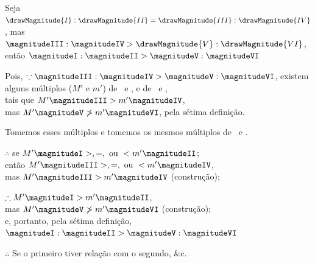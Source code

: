 \documentclass[booklanguage=brazilian]{byrnebook}
\begin{document}
\begin{center}
Seja $\drawMagnitude{I} : \drawMagnitude{II} = \drawMagnitude{III} : \drawMagnitude{IV}$, mas $\magnitudeIII : \magnitudeIV > \drawMagnitude{V} : \drawMagnitude{VI}$,\\
então $\magnitudeI : \magnitudeII > \magnitudeV : \magnitudeVI$

Pois, $\because \magnitudeIII : \magnitudeIV > \magnitudeV : \magnitudeVI$, existem alguns múltiplos ($M'$ e $m'$) de \magnitudeIII\ e \magnitudeV, e de \magnitudeIV\ e \magnitudeVI,\\ %
tais que $M' \magnitudeIII > m' \magnitudeIV$,\\
mas $M' \magnitudeV \ngtr m' \magnitudeVI$, pela sétima definição. %

Tomemos esses múltiplos e tomemos os mesmos múltiplos de \magnitudeI\ e \magnitudeII.

$\therefore$  se $M' \magnitudeI >, =, \mbox{ ou } < m' \magnitudeII$;\\
então $M' \magnitudeIII >, =, \mbox{ ou } < m' \magnitudeIV$,\\
mas $M' \magnitudeIII > m' \magnitudeIV$ (construção);

$\therefore M' \magnitudeI > m' \magnitudeII$,\\
mas $M' \magnitudeV \ngtr m' \magnitudeVI$ (construção);\\ %
e, portanto, pela sétima definição,\\
$\magnitudeI : \magnitudeII > \magnitudeV : \magnitudeVI$

$\therefore$ Se o primeiro tiver relação com o segundo, \&c.
\end{center}

\vfill\pagebreak

\label{prop:V.XIV}
\end{document}
